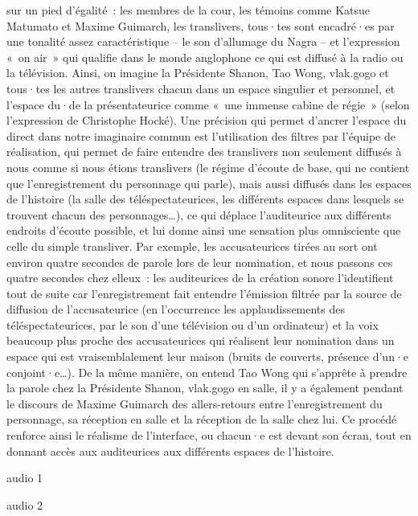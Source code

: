 \documentclass[
]{article}
\begin{document}
sur un pied d'égalité~: les membres de la cour, les témoins comme Katsue Matumato et Maxime Guimarch, les translivers, tous·tes sont encadré·es par une tonalité assez caractéristique -- le son d'allumage du Nagra -- et l'expression «~on air~» qui qualifie dans le monde anglophone ce qui est diffusé à la radio ou la télévision. Ainsi, on imagine la Présidente Shanon, Tao Wong, vlak.gogo et tous·tes les autres translivers chacun dans un espace singulier et personnel, et l'espace du·de la présentateurice comme «~une immense cabine de régie~» (selon l'expression de Christophe Hocké). Une précision qui permet d'ancrer l'espace du direct dans notre imaginaire commun est l'utilisation des filtres par l'équipe de réalisation, qui permet de faire entendre des translivers non seulement diffusés à nous comme si nous étions translivers (le régime d'écoute de base, qui ne contient que l'enregistrement du personnage qui parle), mais aussi diffusés dans les espaces de l'histoire (la salle des téléspectateurices, les différents espaces dans lesquels se trouvent chacun des personnages\ldots), ce qui déplace l'auditeurice aux différents endroits d'écoute possible, et lui donne ainsi une sensation plus omnisciente que celle du simple transliver. Par exemple, les accusateurices tirées au sort ont environ quatre secondes de parole lors de leur nomination, et nous passons ces quatre secondes chez elleux~: les auditeurices de la création sonore l'identifient tout de suite car l'enregistrement fait entendre l'émission filtrée par la source de diffusion de l'accusateurice (en l'occurrence les applaudissements des téléspectateurices, par le son d'une télévision ou d'un ordinateur) et la voix beaucoup plus proche des accusateurices qui réalisent leur nomination dans un espace qui est vraisemblalement leur maison (bruits de couverts, présence d'un·e conjoint·e\ldots). De la même manière, on entend Tao Wong qui s'apprête à prendre la parole chez la Présidente Shanon, vlak.gogo en salle, il y a également pendant le discours de Maxime Guimarch des allers-retours entre l'enregistrement du personnage, sa réception en salle et la réception de la salle chez lui. Ce procédé renforce ainsi le réalisme de l'interface, ou chacun·e est devant son écran, tout en donnant accès aux auditeurices aux différents espaces de l'histoire.

audio 1

\label{audio-1}

audio 2

\label{audio-2}
\end{document}
